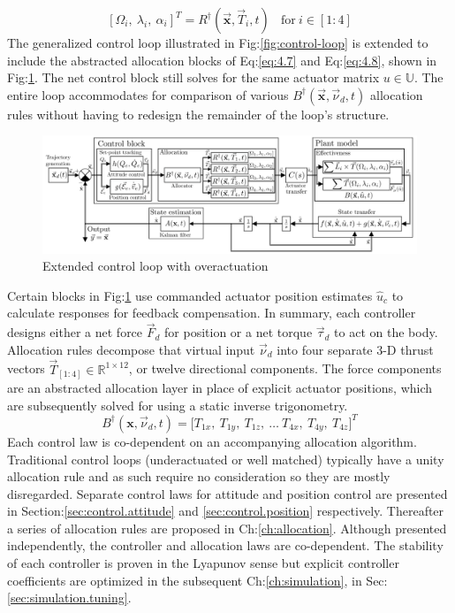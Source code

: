 \begin{equation}\label{eq:4.8}
[\Omega_i,~\lambda_i,~\alpha_i]^T=R^\dagger(\vec{\mathbf{x}},\vec{T}_i,t)~~~~\text{for}~i\in[1:4]
\end{equation}
The generalized control loop illustrated in Fig:\ref{fig:control-loop} is extended to include the abstracted allocation blocks of Eq:\ref{eq:4.7} and Eq:\ref{eq:4.8}, shown in Fig:\ref{fig:control-block}. The net control block still solves for the same actuator matrix $u\in\mathbb{U}$. The entire loop accommodates for comparison of various $B^\dagger(\vec{\mathbf{x}},\vec{\nu}_d,t)$ allocation rules without having to redesign the remainder of the loop's structure.
\begin{figure}[htbp]
\vspace{-6pt}
\centering
\includegraphics[width=\textwidth]{figs/control-block}
\caption{Extended control loop with overactuation}
\label{fig:control-block}
\vspace{-8pt}
\end{figure}
\par
Certain blocks in Fig:\ref{fig:control-block} use commanded actuator position estimates $\hat{u}_c$ to calculate responses for feedback compensation. In summary, each controller designs either a net force $\vec{F}_d$ for position or a net torque $\vec{\tau}_d$ to act on the body. Allocation rules decompose that virtual input $\vec{\nu}_d$ into four separate 3-D thrust vectors $\vec{T}_{[1:4]}\in\mathbb{R}^{1\times 12}$, or twelve directional components. The force components are an abstracted allocation layer in place of explicit actuator positions, which are subsequently solved for using a static inverse trigonometry.
\begin{equation}
B^{\dagger}(\mathbf{x},\vec{\nu}_d,t)=\big[ T_{1x},~T_{1y},~T_{1z},~\ldots~T_{4x},~T_{4y},~T_{4z}\big]^T
\end{equation}
Each control law is co-dependent on an accompanying allocation algorithm. Traditional control loops (underactuated or well matched) typically have a unity allocation rule and as such require no consideration so they are mostly disregarded. Separate control laws for attitude and position control are presented in Section:\ref{sec:control.attitude} and \ref{sec:control.position} respectively. Thereafter a series of allocation rules are proposed in Ch:\ref{ch:allocation}. Although presented independently, the controller and allocation laws are co-dependent. The stability of each controller is proven in the Lyapunov sense but explicit controller coefficients are optimized in the subsequent Ch:\ref{ch:simulation}, in Sec:\ref{sec:simulation.tuning}.
